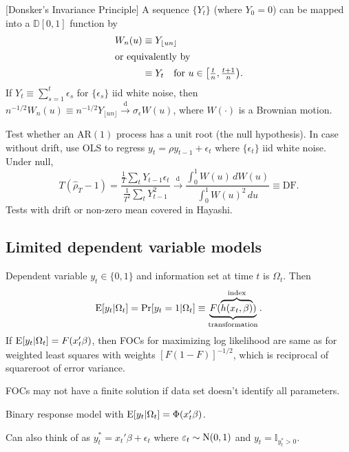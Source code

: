 \documentclass[8pt,letterpaper, landscape]{extarticle} %
\begin{document}
\begin{multicols}{3}
\begin{description}
 [Donsker's Invariance Principle] A sequence $ \{ Y_t \} $ (where $ Y_0 = 0 $) can be mapped into a $ \mathbb{D}[0,1] $ function by
\begin{align*}
W_n (u) &\equiv Y_{\lfloor un \rfloor} \\
\intertext{or equivalently by}
&\equiv Y_{t} \quad \text{for $ u \in \bigl [ \tfrac{t}{n}, \tfrac{t+1}{n} \bigr ) $} .
\end{align*}
If $ Y_t \equiv \sum_{s=1}^{t} \epsilon_{s} $ for $ \{ \epsilon_s \} $ iid white noise, then $ n^{-1/2} W_n (u) \equiv n^{-1/2} Y_{\lfloor un \rfloor} \xrightarrow{\text{d}} \sigma_\epsilon W(u) $, where $ W(\cdot) $ is a Brownian motion.

 Test whether an $ \text{AR}(1) $ process has a unit root (the null hypothesis). In case without drift, use OLS to regress $ y_t = \rho y_{t-1} + \epsilon_t $ where $ \{ \epsilon_t \} $ iid white noise. Under null,
\[ T (\hat{\rho}_T - 1) = \frac{\tfrac{1}{T} \sum_{t} Y_{t-1} \epsilon_t}{\tfrac{1}{T^2} \sum_t Y_{t-1}^{2}} \xrightarrow{\text{d}} \frac{\int_0^1 W(u) \, dW(u)}{\int_0^1 W(u)^2 \, du} \equiv \text{DF}. \]
Tests with drift or non-zero mean covered in Hayashi.

\subsection{Limited dependent variable models}
 Dependent variable $ y_t \in \{ 0,1 \} $ and information set at time $ t $ is $ \Omega_t $. Then
\[ \operatorname{E} [y_t | \Omega_t] = \Pr [y_t = 1 | \Omega_t] \equiv \underbrace{F( \overbrace{h(x_t, \beta)}^{\text{index}})}_{\text{transformation}}. \]
If $ \operatorname{E} [y_t | \Omega_t] = F(x_{t}' \beta) $, then FOCs for maximizing log likelihood are same as for weighted least squares with weights $ [F (1-F)]^{-1/2} $, which is reciprocal of squareroot of error variance.

FOCs may not have a finite solution if data set doesn't identify all parameters.

 Binary response model with $ \operatorname{E} [y_t | \Omega_t] = \Phi (x_{t}' \beta) $.

Can also think of as $ y_{t}^* = x_{t}' \beta + \epsilon_t $ where $ \varepsilon_t \sim \operatorname{N} (0,1) $ and $ y_t = \mathbb{I}_{y_{t}^* > 0} $.


\end{description}
\end{multicols}
\end{document}
